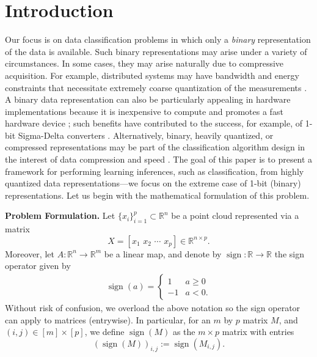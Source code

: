 \documentclass[twoside,11pt]{article}
\def \R {\mathbb{R}}
\DeclareMathOperator*{\sign}{sign}
\begin{document}
\section{Introduction}
Our focus is on data classification problems in which only a \textit{binary} representation of the data is available. Such binary representations may arise under a variety of circumstances. In some cases, they may arise naturally due to compressive acquisition. For example, distributed systems may have bandwidth and energy constraints that necessitate extremely coarse quantization of the measurements \citep{fang2014sparse}. 
A binary data representation can also be particularly appealing in hardware implementations because it is inexpensive to compute and promotes a fast hardware device \citep{JacquLBB_Robust,LaskaWYB_Trust}; such benefits have contributed to the success, for example, of 1-bit Sigma-Delta converters \citep{aziz1996overview,candy1962oversampling}. Alternatively, binary, heavily quantized, or compressed representations may be part of the classification algorithm design in the interest of data compression and speed  \citep{BoufoB_1Bit,hunter2010compressive,calderbank2009compressed,davenport2010signal,gupta2010sample,hahn2014adaptive}. The goal of this paper is to present a framework for performing learning inferences, such as classification, from highly quantized data representations---we focus on the extreme case of 1-bit (binary) representations. Let us begin with the mathematical formulation of this problem. 

{\bfseries Problem Formulation.} Let $\{x_i\}_{i=1}^{p}\subset \R^n$ be a point cloud represented via a matrix $$X = [x_1\,\, x_2\,\, \cdots \,\, x_p] \in \R^{n\times p}.$$ Moreover,   let $A: \R^n \to \R^m$ be a linear map, and  denote by $\sign: \R \to \R$ the sign operator given by 
\begin{align*}
\sign(a) = 
\begin{cases}
1 & a\geq 0 \\
-1 & a<0.
\end{cases}
\end{align*}
Without risk of confusion, we overload the above notation so the sign operator can apply to matrices (entrywise). In particular,  for an
$m$ by $p$ matrix $M$, and $(i,j) \in [m]\times [p]$, we define $\sign(M)$ as the $m\times p$ matrix with entries 
\begin{equation*}
(\sign(M))_{i,j} := \sign(M_{i,j}).
\end{equation*}
\end{document}
